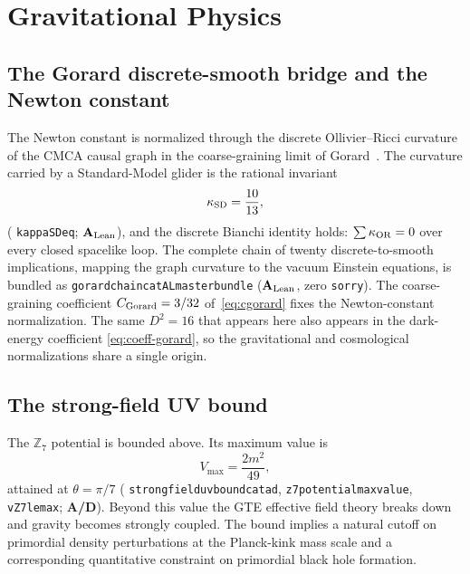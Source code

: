 \documentclass[11pt]{article}
\theoremstyle{remark}
\newcommand{\ZS}{\mathbb{Z}_7}
\newcommand{\lean}[1]{%
  \penalty-100
  \begingroup\def\_{\textunderscore\allowbreak}\texttt{#1}\endgroup}
\newcommand{\CMCA}{\text{CMCA}}
\newcommand{\CGorard}{C_{\rm Gorard}}
\newcommand{\kSD}{\kappa_{\rm SD}}
\newcommand{\CatAL}{\ensuremath{\textbf{A}_{\rm Lean}}}
\newcommand{\CatAD}{\textbf{A/D}}
\begin{document}
\section{Gravitational Physics}
\label{sec:grav}

\subsection{The Gorard discrete-smooth bridge and the Newton constant}

The Newton constant is normalized through the discrete Ollivier--Ricci curvature
of the $\CMCA$ causal graph in the coarse-graining limit of
Gorard~\cite{Gorard2020Rel}. The curvature carried by a Standard-Model glider is
the rational invariant
\begin{equation}
  \kSD = \frac{10}{13},
  \label{eq:ksd}
\end{equation}
(\lean{kappa\_SD\_eq\_10\_13}; \CatAL), and the discrete Bianchi identity holds:
$\sum \kappa_{\rm OR} = 0$ over every closed spacelike loop. The complete chain of
twenty discrete-to-smooth implications, mapping the graph curvature to the vacuum
Einstein equations, is bundled as
\lean{gorard\_chain\_catAL\_master\_bundle} (\CatAL, zero \texttt{sorry}). The
coarse-graining coefficient $\CGorard = 3/32$ of~\eqref{eq:cgorard} fixes the
Newton-constant normalization. The same $D^2 = 16$ that appears here also appears
in the dark-energy coefficient \eqref{eq:coeff-gorard}, so the gravitational and
cosmological normalizations share a single origin.

\subsection{The strong-field UV bound}

The $\ZS$ potential is bounded above. Its maximum value is
\begin{equation}
  V_{\max} = \frac{2m^2}{49},
  \label{eq:vmax}
\end{equation}
attained at $\theta = \pi/7$ (\lean{strong\_field\_uv\_bound\_catad},
\lean{z7\_potential\_max\_value}, \lean{vZ7\_le\_max}; \CatAD). Beyond this value the
GTE effective field theory breaks down and gravity becomes strongly coupled. The
bound implies a natural cutoff on primordial density perturbations at the
Planck-kink mass scale and a corresponding quantitative constraint on primordial
black hole formation.
\end{document}
